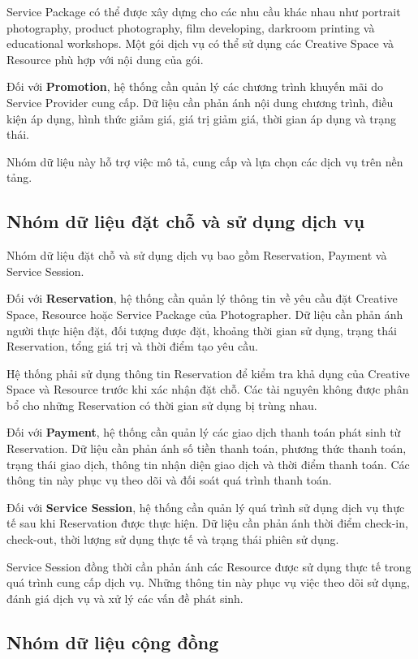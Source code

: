 Service Package có thể được xây dựng cho các nhu cầu khác nhau như portrait photography, product photography, film developing, darkroom printing và educational workshops. Một gói dịch vụ có thể sử dụng các Creative Space và Resource phù hợp với nội dung của gói.

Đối với \textbf{Promotion}, hệ thống cần quản lý các chương trình khuyến mãi do Service Provider cung cấp. Dữ liệu cần phản ánh nội dung chương trình, điều kiện áp dụng, hình thức giảm giá, giá trị giảm giá, thời gian áp dụng và trạng thái.

Nhóm dữ liệu này hỗ trợ việc mô tả, cung cấp và lựa chọn các dịch vụ trên nền tảng.

\subsection{Nhóm dữ liệu đặt chỗ và sử dụng dịch vụ}

Nhóm dữ liệu đặt chỗ và sử dụng dịch vụ bao gồm Reservation, Payment và Service Session.

Đối với \textbf{Reservation}, hệ thống cần quản lý thông tin về yêu cầu đặt Creative Space, Resource hoặc Service Package của Photographer. Dữ liệu cần phản ánh người thực hiện đặt, đối tượng được đặt, khoảng thời gian sử dụng, trạng thái Reservation, tổng giá trị và thời điểm tạo yêu cầu.

Hệ thống phải sử dụng thông tin Reservation để kiểm tra khả dụng của Creative Space và Resource trước khi xác nhận đặt chỗ. Các tài nguyên không được phân bổ cho những Reservation có thời gian sử dụng bị trùng nhau.

Đối với \textbf{Payment}, hệ thống cần quản lý các giao dịch thanh toán phát sinh từ Reservation. Dữ liệu cần phản ánh số tiền thanh toán, phương thức thanh toán, trạng thái giao dịch, thông tin nhận diện giao dịch và thời điểm thanh toán. Các thông tin này phục vụ theo dõi và đối soát quá trình thanh toán.

Đối với \textbf{Service Session}, hệ thống cần quản lý quá trình sử dụng dịch vụ thực tế sau khi Reservation được thực hiện. Dữ liệu cần phản ánh thời điểm check-in, check-out, thời lượng sử dụng thực tế và trạng thái phiên sử dụng.

Service Session đồng thời cần phản ánh các Resource được sử dụng thực tế trong quá trình cung cấp dịch vụ. Những thông tin này phục vụ việc theo dõi sử dụng, đánh giá dịch vụ và xử lý các vấn đề phát sinh.

\subsection{Nhóm dữ liệu cộng đồng}

